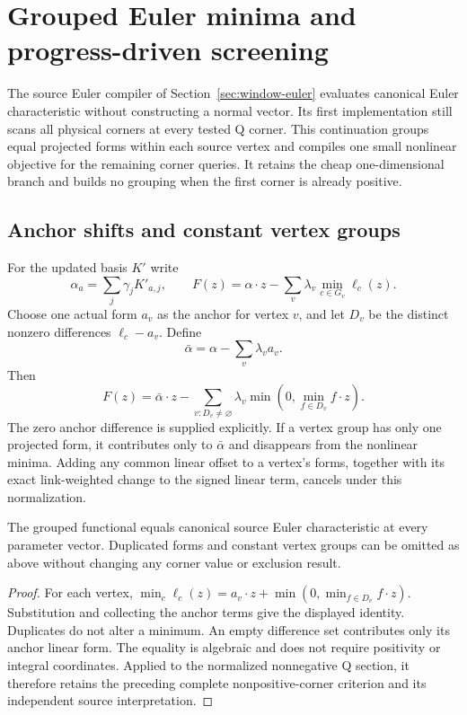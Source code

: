 \section{Grouped Euler minima and progress-driven screening}
\label{sec:euler-aggregate}

The source Euler compiler of Section~\ref{sec:window-euler} evaluates
canonical Euler characteristic without constructing a normal vector.
Its first implementation still scans all physical corners at every tested
Q corner. This continuation groups equal projected forms within each
source vertex and compiles one small nonlinear objective for the remaining
corner queries. It retains the cheap one-dimensional branch and builds
no grouping when the first corner is already positive.

\subsection{Anchor shifts and constant vertex groups}

For the updated basis $K'$ write
\[
 \alpha_a=\sum_j\gamma_jK'_{a,j},\qquad
 F(z)=\alpha\cdot z-\sum_v\lambda_v\min_{c\in G_v}\ell_c(z).
\]
Choose one actual form $a_v$ as the anchor for vertex $v$, and let $D_v$
be the distinct nonzero differences $\ell_c-a_v$. Define
\[
 \bar\alpha=\alpha-\sum_v\lambda_va_v.
\]
Then
\[
 F(z)=\bar\alpha\cdot z-
       \sum_{v:D_v\ne\varnothing}\lambda_v
                   \min\!\left(0,\min_{f\in D_v}f\cdot z\right).
\]
The zero anchor difference is supplied explicitly. If a vertex group has
only one projected form, it contributes only to $\bar\alpha$ and disappears
from the nonlinear minima. Adding any common linear offset to a vertex's
forms, together with its exact link-weighted change to the signed linear
term, cancels under this normalization.

\begin{proposition}
The grouped functional equals canonical source Euler characteristic at
every parameter vector. Duplicated forms and constant vertex groups can
be omitted as above without changing any corner value or exclusion result.
\end{proposition}
\begin{proof}
For each vertex,
$\min_c\ell_c(z)=a_v\cdot z+\min(0,\min_{f\in D_v}f\cdot z)$.
Substitution and collecting the anchor terms give the displayed identity.
Duplicates do not alter a minimum. An empty difference set contributes
only its anchor linear form. The equality is algebraic and does not require
positivity or integral coordinates. Applied to the normalized nonnegative
Q section, it therefore retains the preceding complete nonpositive-corner
criterion and its independent source interpretation.
\end{proof}


